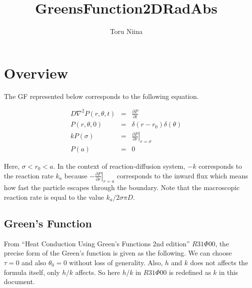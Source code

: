 \documentclass{article}
\begin{document}
\title{GreensFunction2DRadAbs}
\author{Toru Niina}
\maketitle

\section{Overview}

The GF represented below corresponds to the following equation.

\begin{eqnarray}
    D\nabla^2 P(r, \theta, t) &=& \frac{\partial P}{\partial t}\\
    P(r, \theta, 0) &=& \delta(r - r_0)\delta(\theta) \\
    kP(\sigma) &=& \left.\frac{\partial P}{\partial r}\right|_{r=\sigma} \\
    P(a)  &=& 0
\end{eqnarray}

Here, $\sigma < r_0 < a$. In the context of reaction-diffusion system,
$-k$ corresponds to the reaction rate $k_a$ because
$-\left.\frac{\partial P}{\partial r}\right|_{r=a}$ corresponds to the inward
flux which means how fast the particle escapes through the boundary. Note that
the macroscopic reaction rate is equal to the value $k_a / 2\sigma\pi D$.

\subsection{Green's Function}

From ``Heat Conduction Using Green's Functions 2nd edition'' $R31\Phi00$,
the precise form of the Green's function is given as the following.
We can choose $\tau = 0$ and also $\theta_0 = 0$ without loss of generality.
Also, $h$ and $k$ does not affects the formula itself, only $h/k$ affects.
So here $h/k$ in $R31\Phi00$ is redefined as $k$ in this document.
\end{document}
